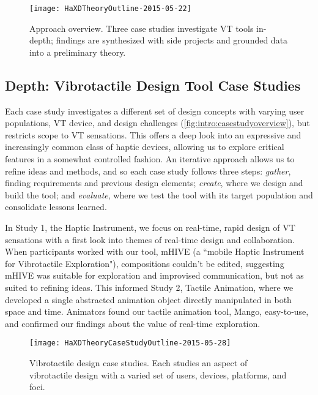 \begin{figure}[htbp]
\begin{center}
\texttt{[image: HaXDTheoryOutline-2015-05-22]}
\caption{Approach overview. Three case studies investigate VT tools in-depth; findings are synthesized with side projects and grounded data into a preliminary theory.}
\label{fig:intro:methodologyoverview}
\end{center}
\end{figure}






\subsection{Depth: Vibrotactile Design Tool Case Studies}

Each case study investigates a different set of design concepts with varying user populations, VT device, and design challenges (\autoref{fig:intro:casestudyoverview}), but restricts scope to VT sensations.
This offers a deep look into an expressive and increasingly common class of haptic devices, allowing us to explore critical features in a somewhat controlled fashion.
An iterative approach allows us to refine ideas and methods, and so each case study follows three steps: \emph{gather}, finding requirements and previous design elements; \emph{create}, where we design and build the tool; and \emph{evaluate}, where we test the tool with its target population and consolidate lessons learned.

In Study 1, the Haptic Instrument, we focus on real-time, rapid design of VT sensations with a first look into themes of real-time design and collaboration.
When participants worked with our tool, mHIVE (a ``mobile Haptic Instrument for Vibrotactile Exploration"), compositions couldn't be edited, suggesting mHIVE was suitable for exploration and improvised communication, but not as suited to refining ideas.
This informed Study 2, Tactile Animation, where we developed a single abstracted animation object directly manipulated in both space and time.
Animators found our tactile animation tool, Mango, easy-to-use, and confirmed our findings about the value of real-time exploration.


\begin{figure}[htbp]
\begin{center}
\texttt{[image: HaXDTheoryCaseStudyOutline-2015-05-28]}
\caption{Vibrotactile design case studies. Each studies an aspect of vibrotactile design with a varied set of users, devices, platforms, and foci.}
\label{fig:intro:casestudyoverview}
\end{center}
\end{figure}

